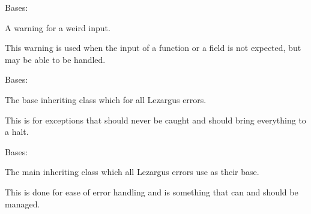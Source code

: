 \documentclass[letterpaper,11pt,english]{sphinxmanual}
\begin{document}
\begin{savenotes}\begin{fulllineitems}
\label{\detokenize{code/lezargus.library.logging:lezargus.library.logging.InputWarning}}
\pysigstartsignatures
{}
\pysigstopsignatures
\sphinxAtStartPar
Bases: {\hyperref[\detokenize{code/lezargus.library.logging:lezargus.library.logging.LezargusWarning}]{}}

\sphinxAtStartPar
A warning for a weird input.

\sphinxAtStartPar
This warning is used when the input of a function or a field is not
expected, but may be able to be handled.

\end{fulllineitems}\end{savenotes}


\begin{savenotes}\begin{fulllineitems}
\label{\detokenize{code/lezargus.library.logging:lezargus.library.logging.LezargusBaseError}}
\pysigstartsignatures
{}
\pysigstopsignatures
\sphinxAtStartPar
Bases: 

\sphinxAtStartPar
The base inheriting class which for all Lezargus errors.

\sphinxAtStartPar
This is for exceptions that should never be caught and should bring
everything to a halt.

\end{fulllineitems}\end{savenotes}


\begin{savenotes}\begin{fulllineitems}
\label{\detokenize{code/lezargus.library.logging:lezargus.library.logging.LezargusError}}
\pysigstartsignatures
{}
\pysigstopsignatures
\sphinxAtStartPar
Bases: 

\sphinxAtStartPar
The main inheriting class which all Lezargus errors use as their base.

\sphinxAtStartPar
This is done for ease of error handling and is something that can and
should be managed.

\end{fulllineitems}\end{savenotes}
\end{document}
